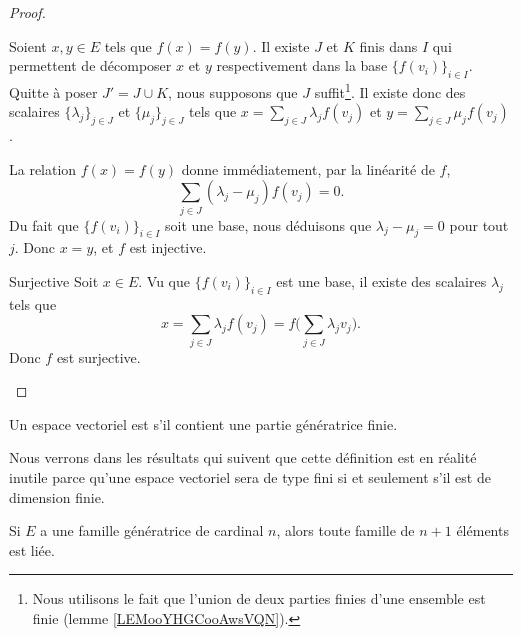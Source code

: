 \begin{proof}
\begin{subproof}
\begin{subproof}
                    Soient \( x,y\in E\) tels que \( f(x)=f(y)\). Il existe \( J\) et \( K\) finis dans \( I\) qui permettent de décomposer \( x\) et \( y\) respectivement dans la base \( \{ f(v_i) \}_{i\in I}\). Quitte à poser \( J'=J\cup K\), nous supposons que \( J\) suffit\footnote{Nous utilisons le fait que l'union de deux parties finies d'une ensemble est finie (lemme \ref{LEMooYHGCooAwsVQN}).}. Il existe donc des scalaires \( \{ \lambda_j \}_{j\in J}\) et \( \{ \mu_j \}_{j\in J}\) tels que \( x=\sum_{j\in J}\lambda_jf(v_j)\) et \( y=\sum_{j\in J}\mu_jf(v_j)\).

                    La relation \( f(x)=f(y)\) donne immédiatement, par la linéarité de \( f\),
                    \begin{equation}
                        \sum_{j\in J}(\lambda_j-\mu_j)f(v_j)=0.
                    \end{equation}
                    Du fait que \( \{ f(v_i) \}_{i\in I}\) soit une base, nous déduisons que \( \lambda_j-\mu_j=0\) pour tout \( j\). Donc \( x=y\), et \( f\) est injective.
                \item[Surjective]
                    Soit \( x\in E\). Vu que \( \{ f(v_i) \}_{i\in I}\) est une base, il existe des scalaires \( \lambda_j\) tels que 
                    \begin{equation}
                        x=\sum_{j\in J}\lambda_jf(v_j)=f\big( \sum_{j\in J}\lambda_jv_j \big).
                    \end{equation}
                    Donc \( f\) est surjective.
            \end{subproof}
    \end{subproof}
\end{proof}

\begin{definition}
    Un espace vectoriel est  s'il contient une partie génératrice finie.
\end{definition}
Nous verrons dans les résultats qui suivent que cette définition est en réalité inutile parce qu'une espace vectoriel sera de type fini si et seulement s'il est de dimension finie.

\begin{lemma}       \label{LemytHnlD}
    Si \( E\) a une famille génératrice de cardinal \( n\), alors toute famille de \( n+1\) éléments est liée.
\end{lemma}

